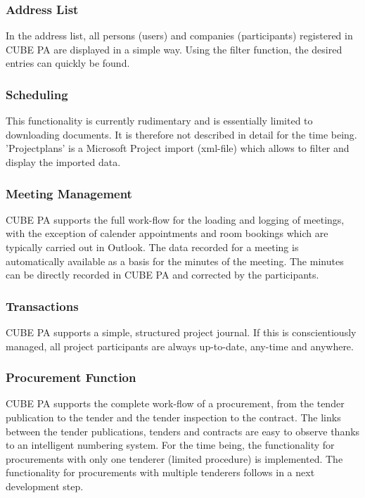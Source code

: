 \pagebreak
\subsubsection{Address List}

In the address list, all persons (users) and companies (participants) registered in CUBE PA are displayed in a simple way. Using the filter function, the desired entries can quickly be found.

\subsubsection{Scheduling}

This functionality is currently rudimentary and is essentially limited to downloading documents. It is therefore not described in detail for the time being. 'Projectplans' is a Microsoft Project import (xml-file) which allows to filter and display the imported data.

\subsubsection{Meeting Management}

CUBE PA supports the full work-flow for the loading and logging of meetings, with the exception of calender appointments and room bookings which are typically carried out in Outlook. The data recorded for a meeting is automatically available as a basis for the minutes of the meeting. The minutes can be directly recorded in CUBE PA and corrected by the participants.

\subsubsection{Transactions}

CUBE PA supports a simple, structured project journal. If this is conscientiously managed, all project participants are always up-to-date, any-time and anywhere.

\subsubsection{Procurement Function}

CUBE PA supports the complete work-flow of a procurement, from the tender publication to the tender and the tender inspection to the contract. The links between the tender publications, tenders and contracts are easy to observe thanks to an intelligent numbering system. For the time being, the functionality for procurements with only one tenderer (limited procedure) is implemented. The functionality for procurements with multiple tenderers follows in a next development step.

